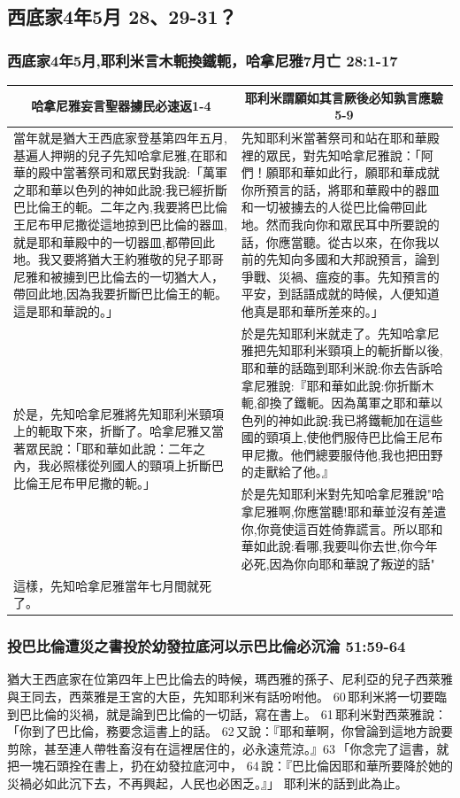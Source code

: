 \subsection{西底家4年5月 28、29-31？}
\subsubsection{西底家4年5月,耶利米言木軛換鐵軛，哈拿尼雅7月亡 28:1-17}
\begin{table}[H]
\centering
\begin{tabular}{p{}|p{9.8cm}}\hline\hline
\multicolumn{1}{c|}{哈拿尼雅妄言聖器擄民必速返1-4}&\multicolumn{1}{c}{耶利米謂願如其言厥後必知孰言應驗5-9}\\\hline
當年就是猶大王西底家登基第四年五月,基遍人押朔的兒子先知哈拿尼雅,在耶和華的殿中當著祭司和眾民對我說:「萬軍之耶和華以色列的神如此說:我已經折斷巴比倫王的軛。二年之內,我要將巴比倫王尼布甲尼撒從這地掠到巴比倫的器皿,就是耶和華殿中的一切器皿,都帶回此地。我又要將猶大王約雅敬的兒子耶哥尼雅和被擄到巴比倫去的一切猶大人，帶回此地,因為我要折斷巴比倫王的軛。這是耶和華說的。」
&先知耶利米當著祭司和站在耶和華殿裡的眾民，對先知哈拿尼雅說：「阿們！願耶和華如此行，願耶和華成就你所預言的話，將耶和華殿中的器皿和一切被擄去的人從巴比倫帶回此地。然而我向你和眾民耳中所要說的話，你應當聽。從古以來，在你我以前的先知向多國和大邦說預言，論到爭戰、災禍、瘟疫的事。先知預言的平安，到話語成就的時候，人便知道他真是耶和華所差來的。」\\\hline

\multirow{2}{8.cm}{於是，先知哈拿尼雅將先知耶利米頸項上的軛取下來，折斷了。哈拿尼雅又當著眾民說：「耶和華如此說：二年之內，我必照樣從列國人的頸項上折斷巴比倫王尼布甲尼撒的軛。」}
&於是先知耶利米就走了。先知哈拿尼雅把先知耶利米頸項上的軛折斷以後,耶和華的話臨到耶利米說:你去告訴哈拿尼雅說:『耶和華如此說:你折斷木軛,卻換了鐵軛。因為萬軍之耶和華以色列的神如此說:我已將鐵軛加在這些國的頸項上,使他們服侍巴比倫王尼布甲尼撒。他們總要服侍他,我也把田野的走獸給了他。』\\\cline{2-2}
&於是先知耶利米對先知哈拿尼雅說"哈拿尼雅啊,你應當聽!耶和華並沒有差遣你,你竟使這百姓倚靠謊言。所以耶和華如此說:看哪,我要叫你去世,你今年必死,因為你向耶和華說了叛逆的話"\\\hline
這樣，先知哈拿尼雅當年七月間就死了。&\\\hline
\end{tabular}
\end{table}

\subsubsection{投巴比倫遭災之書投於幼發拉底河以示巴比倫必沉淪 51:59-64}
猶大王西底家在位第四年上巴比倫去的時候，瑪西雅的孫子、尼利亞的兒子西萊雅與王同去，西萊雅是王宮的大臣，先知耶利米有話吩咐他。 60 耶利米將一切要臨到巴比倫的災禍，就是論到巴比倫的一切話，寫在書上。 61 耶利米對西萊雅說：「你到了巴比倫，務要念這書上的話。 62 又說：『耶和華啊，你曾論到這地方說要剪除，甚至連人帶牲畜沒有在這裡居住的，必永遠荒涼。』63 「你念完了這書，就把一塊石頭拴在書上，扔在幼發拉底河中， 64 說：『巴比倫因耶和華所要降於她的災禍必如此沉下去，不再興起，人民也必困乏。』」 耶利米的話到此為止。

